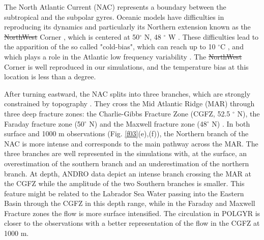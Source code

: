 \documentclass[os, manuscript]{copernicus}
\providecommand{\DIFadd}[1]{{\protect\color{blue}\uwave{#1}}} %
\providecommand{\DIFdel}[1]{{\protect\color{red}\sout{#1}}}                      %
\providecommand{\DIFaddbegin}{} %
\providecommand{\DIFaddend}{} %
\providecommand{\DIFdelbegin}{} %
\providecommand{\DIFdelend}{} %
\begin{document}
The North Atlantic Current (NAC) represents a boundary between the subtropical and the subpolar gyres. Oceanic models have difficulties in reproducing its dynamics and particularly its Northern extension known as the \DIFdelbegin \DIFdel{NorthWest }\DIFdelend \DIFaddbegin \DIFadd{Northwest }\DIFaddend Corner \citep{bryan2007,hecht2008,drews2015}, which is centered at 50$^{\circ}$ N, 48 $^{\circ}$ W \citep{lazier1994}. These difficulties lead to the apparition of the so called "cold-bias", which can reach up to 10 $^{\circ}$C \citep{griffies2009, drews2015}, and which plays a role in the Atlantic low frequency variability \citep{drews2017}. The \DIFdelbegin \DIFdel{NorthWest }\DIFdelend \DIFaddbegin \DIFadd{Northwest }\DIFaddend Corner is well reproduced in our simulations, and the temperature bias at this location is less than a degree.


After turning eastward, the NAC splits into three branches, which are strongly constrained by topography \citep{bower2008}. They cross the Mid Atlantic Ridge (MAR) through three deep fracture zones: the Charlie-Gibbs Fracture Zone (CGFZ, 52.5 $^{\circ}$ N), the Faraday fracture zone (50$^{\circ}$ N) and the Maxwell fracture zone (48$^{\circ}$ N) \citep{bower2002}. In both surface and 1000 m observations (Fig. \ref{f03}(e),(f)), the Northern branch of the NAC is more intense and corresponds to the main pathway across the MAR. The three branches are well represented in the simulations with, at the surface, an overestimation of the southern branch and an underestimation of the northern branch. At depth, ANDRO data depict an intense branch crossing the MAR at the CGFZ while the amplitude of the two Southern branches is smaller. This feature might be related to the Labrador Sea Water passing into the Eastern Basin through the CGFZ in this depth range, while in the Faraday and Maxwell Fracture zones the flow is more surface intensified. The circulation in POLGYR is closer to the observations with a better representation of the flow in the CGFZ at 1000 m. 
\end{document}
